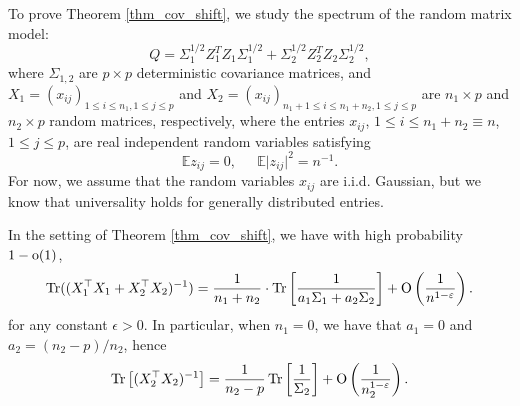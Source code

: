 \medskip
To prove Theorem \ref{thm_cov_shift}, we study the spectrum of the random matrix model:
$$Q= \Sigma_1^{1/2}  Z_1^T Z_1 \Sigma_1^{1/2}  + \Sigma_2^{1/2}  Z_2^T Z_2 \Sigma_2^{1/2} ,$$
where $\Sigma_{1,2}$ are $p\times p$ deterministic covariance matrices, and $X_1=(x_{ij})_{1\le i \le n_1, 1\le j \le p}$ and $X_2=(x_{ij})_{n_1+1\le i \le n_1+n_2, 1\le j \le p}$ are $n_1\times p$ and $n_2 \times p$ random matrices, respectively, where the entries $x_{ij}$, $1 \leq i \leq n_1+n_2\equiv n$, $1 \leq j \leq p$, are real independent random variables satisfying
\begin{equation}\label{eq_12moment} %
\mathbb{E} z_{ij} =0, \ \quad \ \mathbb{E} \vert z_{ij} \vert^2  = n^{-1}.
\end{equation} 
For now, we assume that the random variables $x_{ij}$ are i.i.d. Gaussian, but we know that universality holds for generally distributed entries. %


\begin{lemma}\label{lem_cov_shift}
	In the setting of Theorem \ref{thm_cov_shift}, we have with high probability $1-{\rm o}(1)$,
\begin{align*}
\operatorname{Tr} ((X_1^{\top}X_1 + X_2^{\top}X_2)^{-1}) = \frac{1}{n_1+n_2}\cdot \operatorname{Tr} \left[ \frac{1}{a_1\Sigma_1 + a_2\Sigma_2} \right] +\operatorname{O}\left(\frac{1}{n^{1-\varepsilon}}\right).
\end{align*}
	for any constant $\epsilon>0$. %
	In particular, when $n_1 = 0$, we have that $a_1 = 0$ and $a_2 = (n_2-p) / n_2$, hence
	\[ \operatorname{Tr}\left[(X_2^{\top}X_2)^{-1}\right] = \frac{1}{n_2-p}\operatorname{Tr}\left[\frac 1 {\Sigma_2}\right] + \operatorname{O}\left(\frac{1}{n_2^{1-\varepsilon}}\right). \]
\end{lemma}

